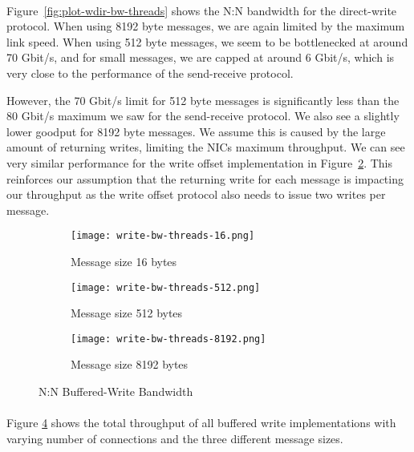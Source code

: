 \paragraph{} Figure~\ref{fig:plot-wdir-bw-threads} shows the N:N bandwidth for the direct-write protocol. When using 8192 
byte messages, we are again limited by the maximum link speed. When using 512 byte messages, we seem to be bottlenecked at around 
70 Gbit/s, and for small messages, we are capped at around 6 Gbit/s, which is very close to the performance of the send-receive
protocol.

However, the 70 Gbit/s limit for 512 byte messages is significantly less than the 80 Gbit/s maximum we saw for the
send-receive protocol. We also see a slightly lower goodput for 8192 byte messages. We assume this is caused by the 
large amount of returning writes, limiting the NICs maximum throughput. We can see very similar performance for the
write offset implementation in Figure~\ref{fig:plot-write-bw-thread-512}. This reinforces our assumption that the returning write
for each message is impacting our throughput as the write offset protocol also needs to issue two writes per message.




\begin{figure}[ht]
  \centering
\begin{subfigure}[b]{0.49\textwidth}
  \centering
  \texttt{[image: write-bw-threads-16.png]}
  \caption{Message size 16 bytes}
  \label{fig:plot-write-bw-thread-16}
\end{subfigure}
\begin{subfigure}[b]{0.49\textwidth}
  \centering
  \texttt{[image: write-bw-threads-512.png]}
  \caption{Message size 512 bytes}
  \label{fig:plot-write-bw-thread-512}
\end{subfigure}
\begin{subfigure}[b]{0.49\textwidth}
  \centering
  \texttt{[image: write-bw-threads-8192.png]}
  \caption{Message size 8192 bytes}
  \label{fig:plot-write-bw-thread-8192}
\end{subfigure}
  \caption{N:N Buffered-Write Bandwidth}
  \label{fig:plot-write-bw-thread}
\end{figure}


\paragraph{} Figure \ref{fig:plot-write-bw-thread} shows the total throughput of all buffered write implementations
with varying number of connections and the three different message sizes.

